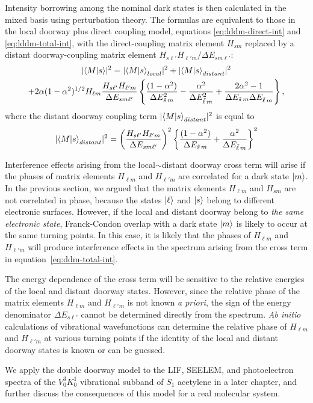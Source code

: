 \documentclass[12pt]{mitthesis}
\newcommand{\ts}{\tilde{s}\,}
\newcommand{\tl}{\tilde{\ell}\,}
\begin{document}
Intensity borrowing among the nominal dark states is then calculated
in the mixed basis using perturbation theory.  The formulas are
equivalent to those in the local doorway plus direct coupling model,
equations \ref{eq:lddm-direct-int} and \ref{eq:lddm-total-int}, with
the direct-coupling matrix element $H_{s m}$ replaced by a distant
doorway-coupling matrix element $H_{s\ell'} H_{\ell' m} / \Delta E_{s
  m \ell'}$:
\begin{multline}
  \label{eq:ddm-total-int}
    \lvert \braket{M|s} \rvert^2 =
    \lvert \braket{M|s}_{local} \rvert^2 + 
    \lvert \braket{M|s}_{distant} \rvert^2 \\
    + 2 \alpha (1-\alpha^2)^{1/2} H_{\ell m} 
    \frac{H_{s \ell'} H_{\ell' m}}{\Delta E_{s m \ell'}}
    \left \lbrace
      \frac{(1-\alpha^2)}{\Delta E_{\ts m}^2}
      - \frac{\alpha^2}{\Delta E_{\tl m}^2}
      + \frac{2\alpha^2 -1}{\Delta E_{\ts m} \Delta E_{\tl m}}
    \right \rbrace,
\end{multline}
where the distant doorway coupling term $\lvert \mathinner{\langle{M|s}\rangle}_{distant}
\rvert^2$ is equal to
\begin{equation}
  \label{eq:ddm-distant-int}
  \lvert \braket{M|s}_{distant} \rvert^2 = 
  \left (
    \frac{H_{s \ell'} H_{\ell' m}}{\Delta E_{s m \ell'}}
  \right )^2
  \left \lbrace
    \frac{(1 - \alpha^2)}{\Delta E_{\ts m}} +
    \frac{\alpha^2}{\Delta E_{\tl m}}
  \right \rbrace^2
\end{equation}

Interference effects arising from the local$\sim$distant doorway cross
term will arise if the phases of matrix elements $H_{\ell m}$ and
$H_{\ell' m}$ are correlated for a dark state $\mathinner{|{m}\rangle}$.  In the
previous section, we argued that the matrix elements $H_{\ell m}$ and
$H_{sm}$ are not correlated in phase, because the states $\mathinner{|{\ell}\rangle}$
and $\mathinner{|{s}\rangle}$ belong to different electronic surfaces.  However, if the
local and distant doorway belong to \emph{the same electronic state},
Franck-Condon overlap with a dark state $\mathinner{|{m}\rangle}$ is likely to occur
at the same turning points. In this case, it is likely that the
phases of $H_{\ell m}$ and $H_{\ell' m}$ will produce interference
effects in the spectrum arising from the cross term in
equation~\ref{eq:ddm-total-int}.  

The energy dependence of the cross term will be sensitive to the
relative energies of the local and distant doorway states.  However,
since the relative phase of the matrix elements $H_{\ell m}$ and
$H_{\ell' m}$ is not known \emph{a priori}, the sign of the energy
denominator $\Delta E_{s \ell'}$ cannot be determined directly from
the spectrum.  \emph{Ab initio} calculations of vibrational
wavefunctions can determine the relative phase of $H_{\ell m}$ and
$H_{\ell' m}$ at various turning points if the identity of the local
and distant doorway states is known or can be guessed.

We apply the double doorway model to the LIF, SEELEM, and
photoelectron spectra of the $V^3_0K^1_0$ vibrational subband of $S_1$
acetylene in a later chapter, and further discuss the consequences of
this model for a real molecular system.
\end{document}
